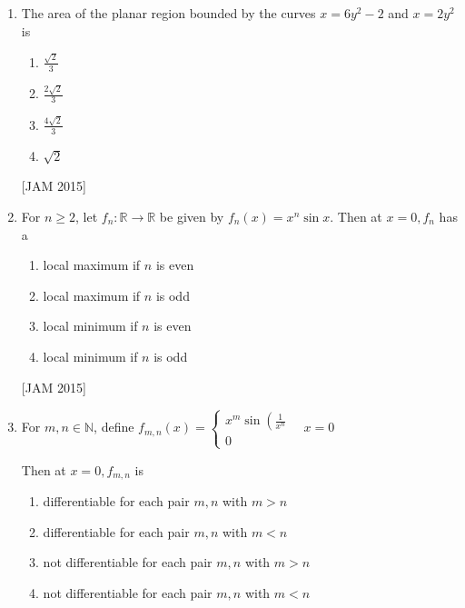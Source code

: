 \begin{enumerate}
\begin{enumerate}
    
\item $x=-3, y=2$ 
\item $x=-2, y=2$ 
\item $x=2, y=3$ 
\item $x=-3, y=4$
\end{enumerate}
\hfill [JAM 2015]




\item  The area of the planar region bounded by the curves $x=6 y^{2}-2$ and $x=2 y^{2}$ is 
\begin{enumerate}
   
\item $\frac{\sqrt{2}}{3}$ 
\item $\frac{2 \sqrt{2}}{3}$ 
\item $\frac{4 \sqrt{2}}{3}$ 
\item $\sqrt{2}$  
\end{enumerate}
\hfill [JAM 2015]

\item 
For $n \geq 2$, let $f_{n}: \mathbb{R} \rightarrow \mathbb{R}$ be given by $f_{n}(x)=x^{n} \sin x$. Then at $x=0, f_{n}$ has a 
\begin{enumerate}
    \item local maximum if $n$ is even 
\item local maximum if $n$ is odd 
\item local minimum if $n$ is even 
\item local minimum if $n$ is odd

\end{enumerate}
\hfill [JAM 2015]




\item  

For $m, n \in \mathbb{N}$, define $f_{m, n}(x)=\left\{\begin{array}{c}x^{m} \sin \left(\frac{1}{x^{n}}\right. \\ 0\end{array} \quad x=0\right.$

Then at $x=0, f_{m, n}$ is 

\begin{enumerate}
    \item differentiable for each pair $m, n$ with $m>n$ 
\item differentiable for each pair $m, n$ with $m<n$ 
\item not differentiable for each pair $m, n$ with $m>n$ 
\item not differentiable for each pair $m, n$ with $m<n$


\end{enumerate}
\end{enumerate}
